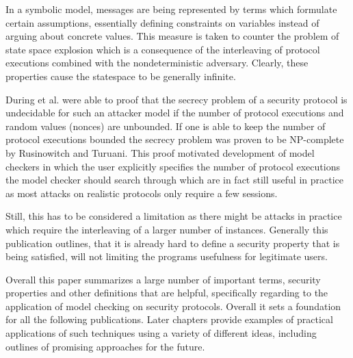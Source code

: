 \documentclass[a4paper,UKenglish]{lipics-v2018}
\begin{document}
In a symbolic model, messages are being represented by terms which formulate certain assumptions, essentially defining constraints on variables instead of arguing about concrete values. This measure is taken to counter the problem of state space explosion which is a consequence of the interleaving of protocol executions combined with the nondeterministic adversary. Clearly, these properties cause the statespace to be generally infinite.\cite{model_checking_security_protocols}

During et al. were able to proof that the secrecy problem of a security protocol is undecidable for such an attacker model if the number of protocol executions and random values (nonces) are unbounded.\cite{DLMS99} If one is able to keep the number of protocol executions bounded the secrecy problem was proven to be NP-complete by Rusinowitch and Turuani.\cite{RT01} This proof motivated development of model checkers in which the user explicitly specifies the number of protocol executions the model checker should search through which are in fact still useful in practice as most attacks on realistic protocols only require a few sessions.\cite{model_checking_security_protocols}

Still, this has to be considered a limitation as there might be attacks in practice which require the interleaving of a larger number of instances. Generally this publication outlines, that it is already hard to define a security property that is being satisfied, will not limiting the programs usefulness for legitimate users.

Overall this paper summarizes a large number of important terms, security properties and other definitions that are helpful, specifically regarding to the application of model checking on security protocols. Overall it sets a foundation for all the following publications. Later chapters provide examples of practical applications of such techniques using a variety of different ideas, including outlines of promising approaches for the future.



\end{document}
